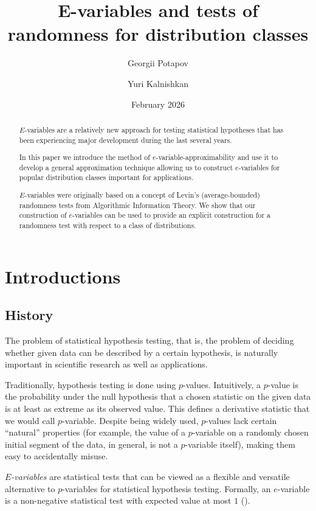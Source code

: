 \documentclass{article}
\title{E-variables and tests of randomness for distribution classes}
\author[1]{Georgii Potapov}
\author[1]{Yuri Kalnishkan}
\affil{Royal Holloway, University of London}
\date{February 2026}
\theoremstyle{definition}
\theoremstyle{definition}
\begin{document}
\maketitle

\begin{abstract}
    $E$-variables are a relatively new approach for testing statistical hypotheses that has been experiencing major development during the last several years.
    
    In this paper we introduce the method of $e$-variable-approximability and use it to develop a general approximation technique allowing us to construct $e$-variables for popular distribution classes important for applications.

    $E$-variables were originally based on a concept of Levin's (average-bounded) randomness tests from Algorithmic Information Theory. We show that our construction of $e$-variables can be used to provide an explicit construction for a randomness test with respect to a class of distributions.
\end{abstract}

\section{Introductions}


\subsection{History}

The problem of statistical hypothesis testing, that is, the problem of deciding whether given data can be described by a certain hypothesis, is naturally important in scientific research as well as applications.

Traditionally, hypothesis testing is done using $p$-values. Intuitively, a $p$-value is the probability under the null hypothesis that a chosen statistic on the given data is at least as extreme as its observed value. This defines a derivative statistic that we would call $p$-variable. Despite being widely used, $p$-values lack certain ``natural'' properties (for example, the value of a $p$-variable on a randomly chosen initial segment of the data, in general, is not a $p$-variable itself), making them easy to accidentally misuse.

\emph{$E$-variables} are statistical tests that can be viewed as a flexible and versatile alternative to $p$-variables for statistical hypothesis testing. Formally, an $e$-variable is a non-negative statistical test with expected value at most $1$ (\cite{vovk2020nonalgorithmic}).
\end{document}
